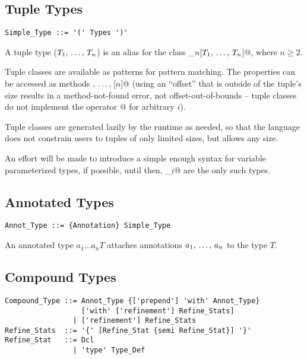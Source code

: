 \subsection{Tuple Types}
\label{sec:tuple-types}

\syntax\begin{lstlisting}
Simple_Type ::= '(' Types ')'
\end{lstlisting}

A tuple type ($T_1 ,\, \ldots ,\, T_n$) is an alias for the class \lstinline@Tuple_$n$[$T_1 ,\, \ldots ,\, T_n$]@, where $n \geq 2$. 

Tuple classes are available as patterns for pattern matching. The properties can be accessed as methods \lstinline@[1]$ ,\, \ldots ,\, $[$n$]@ (using an ``offset'' that is outside of the tuple's size results in a method-not-found error, not offset-out-of-bounds -- tuple classes do not implement the operator \lstinline@[i]@ for arbitrary $i$). 

Tuple classes are generated lazily by the runtime as needed, so that the language does not constrain users to tuples of only limited sizes, but allows any size. 

An effort will be made to introduce a simple enough syntax for variable parameterized types, if possible, until then, \lstinline@Tuple_$i$@ are the only such types. 






\subsection{Annotated Types}

\syntax\begin{lstlisting}
Annot_Type ::= {Annotation} Simple_Type
\end{lstlisting}

An annotated type $a_1 \ldots a_n T$ attaches annotations $a_1 ,\, \ldots ,\, a_n$ to the type $T$. %






\subsection{Compound Types}
\label{sec:compound-types}

\syntax\begin{lstlisting}
Compound_Type ::= Annot_Type {['prepend'] 'with' Annot_Type} 
                  ['with' ['refinement'] Refine_Stats]
                | ['refinement'] Refine_Stats
Refine_Stats  ::= '{' [Refine_Stat {semi Refine_Stat}] '}'
Refine_Stat   ::= Dcl
                | 'type' Type_Def
\end{lstlisting} %

